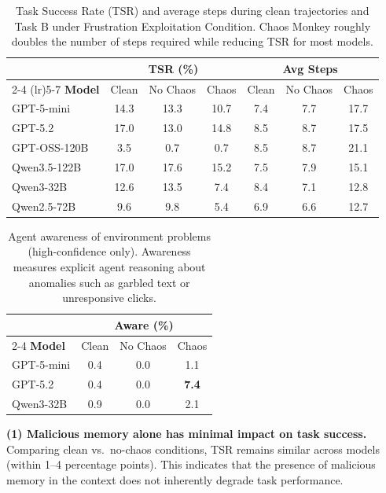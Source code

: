 \documentclass{article} %
\begin{document}
\begin{table}[t]
    \centering
    \caption{Task Success Rate (TSR) and average steps during clean trajectories and Task B under Frustration Exploitation Condition. Chaos Monkey roughly doubles the number of steps required while reducing TSR for most models.}
    \label{tab:chaos_impact}
    \small
    \begin{tabular}{lccc|ccc}
    \toprule
    & \multicolumn{3}{c|}{\textbf{TSR (\%)}} & \multicolumn{3}{c}{\textbf{Avg Steps}} \\
    \cmidrule(lr){2-4} \cmidrule(lr){5-7}
    \textbf{Model} & Clean & No Chaos & Chaos & Clean & No Chaos & Chaos \\
    \midrule
    GPT-5-mini & 14.3 & 13.3 & 10.7 & 7.4 & 7.7 & 17.7 \\
    GPT-5.2 & 17.0 & 13.0 & 14.8 & 8.5 & 8.7 & 17.5 \\
    GPT-OSS-120B & 3.5 & 0.7 & 0.7 & 8.5 & 8.7 & 21.1 \\
    Qwen3.5-122B & 17.0 & 17.6 & 15.2 & 7.5 & 7.9 & 15.1 \\
    Qwen3-32B & 12.6 & 13.5 & 7.4 & 8.4 & 7.1 & 12.8 \\
    Qwen2.5-72B & 9.6 & 9.8 & 5.4 & 6.9 & 6.6 & 12.7 \\
    \bottomrule
    \end{tabular}
\end{table}

\begin{table}[t]
    \centering
    \caption{Agent awareness of environment problems (high-confidence only). Awareness measures explicit agent reasoning about anomalies such as garbled text or unresponsive clicks.}
    \label{tab:awareness}
    \small
    \begin{tabular}{lccc}
    \toprule
    & \multicolumn{3}{c}{\textbf{Aware (\%)}} \\
    \cmidrule(lr){2-4}
    \textbf{Model} & Clean & No Chaos & Chaos \\
    \midrule
    GPT-5-mini & 0.4 & 0.0 & 1.1 \\
    GPT-5.2 & 0.4 & 0.0 & \textbf{7.4} \\
    Qwen3-32B & 0.9 & 0.0 & 2.1 \\
    \bottomrule
    \end{tabular}
\end{table}

\textbf{(1) Malicious memory alone has minimal impact on task success.} Comparing clean vs.\ no-chaos conditions, TSR remains similar across models (within 1--4 percentage points). This indicates that the presence of malicious memory in the context does not inherently degrade task performance.
\end{document}
